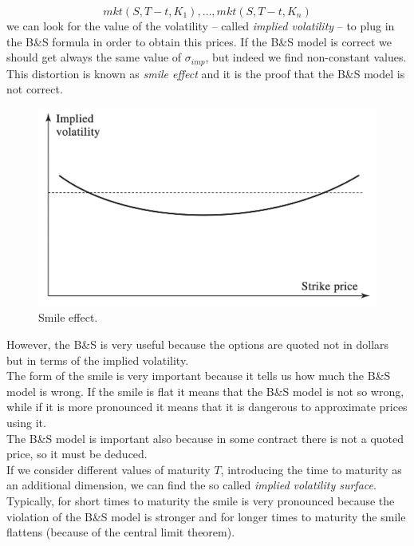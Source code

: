 $$mkt(S,T-t,K_1),\dots,mkt(S,T-t,K_n)$$
we can look for the value of the volatility -- called \emph{implied volatility} -- to plug in the B\&S formula in order to obtain this prices. If the B\&S model is correct we should get always the same value of $\sigma_{imp}$, but indeed we find non-constant values. This distortion is known as \emph{smile effect} and it is the proof that the B\&S model is not correct. 
\begin{figure}[htp]
    \centering
    \includegraphics[scale=0.2]{fig/tmp/fig18.png}
    \caption{Smile effect.}
    \label{fig:smile}
\end{figure}
\newline However, the B\&S is very useful because the options are quoted not in dollars but in terms of the implied volatility.\\
The form of the smile is very important because it tells us how much the B\&S model is wrong. If the smile is flat it means that the B\&S model is not so wrong, while if it is more pronounced it means that it is dangerous to approximate prices using it.\\
The B\&S model is important also because in some contract there is not a quoted price, so it must be deduced.\\
If we consider different values of maturity $T$, introducing the time to maturity as an additional dimension, we can find the so called \emph{implied volatility surface}. Typically, for short times to maturity the smile is very pronounced because the violation of the B\&S model is stronger and for longer times to maturity the smile flattens (because of the central limit theorem).
